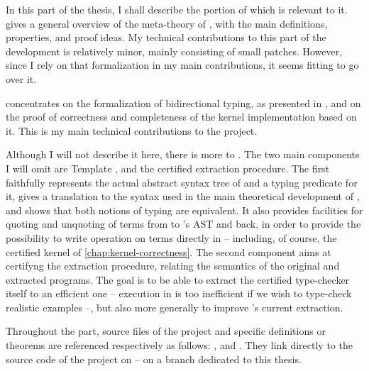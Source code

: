 In this part of the thesis,
I shall describe the portion of  which is relevant to it.
 gives a general overview of
the meta-theory of , with the main definitions, properties, and proof ideas.
My technical contributions to this part of the development is relatively minor,
mainly consisting of small patches. However, since I rely on that formalization
in my main contributions, it seems fitting to go over it.

 concentrates on the formalization of bidirectional typing, as
presented in , and on the proof of correctness and completeness of
the kernel implementation based on it. This is my main technical
contributions to the  project.

Although I will not describe it here, there is more to . The two main components
I will omit are Template , and the certified extraction procedure.
The first faithfully represents the actual abstract
syntax tree of  and a typing predicate for it,
gives a translation to the syntax used in the main theoretical development of ,%
and shows that both notions of typing are equivalent.
It also provides facilities for quoting and unquoting of terms from
 to ’s AST and back, in order to provide the possibility to write operation
on  terms directly in  – including, of course, the certified kernel of
\cref{chap:kernel-correctness}.
The second component aims at certifyng the extraction procedure,
relating the semantics of the original and extracted programs.
The goal is to be able to extract the certified type-checker itself to an efficient one –
execution in  is too inefficient if we wish to type-check realistic examples –,
but also more generally to improve ’s current extraction.

Throughout the part, source files of the  project
and specific definitions or theorems are referenced respectively as follows:
, and . They link directly to the source
code of the project on  – on a branch dedicated to this thesis.